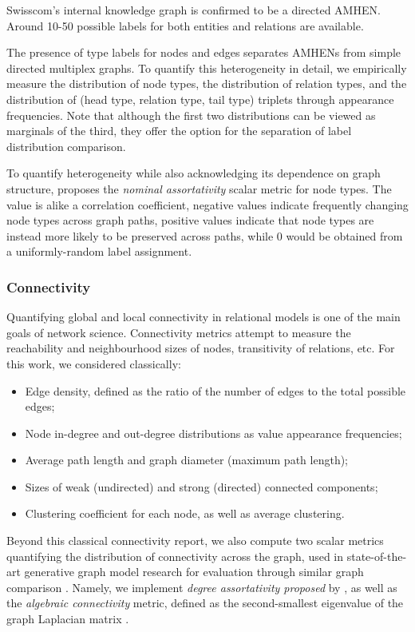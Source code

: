 Swisscom's internal knowledge graph is confirmed to be a directed AMHEN. Around 10-50 possible labels for both entities and relations are available. 
 
The presence of type labels for nodes and edges separates AMHENs from simple directed multiplex graphs. To quantify this heterogeneity in detail, we empirically measure the distribution of node types, the distribution of relation types, and the distribution of (head type, relation type, tail type) triplets through appearance frequencies. Note that although the first two distributions can be viewed as marginals of the third, they offer the option for the separation of label distribution comparison. 

To quantify heterogeneity while also acknowledging its dependence on graph structure, \cite{newman_mixing_2003} proposes the \emph{nominal assortativity} scalar metric for node types. The value is alike a correlation coefficient, negative values indicate frequently changing node types across graph paths, positive values indicate that node types are instead more likely to be preserved across paths, while 0 would be obtained from a uniformly-random label assignment.

\subsubsection{Connectivity}

Quantifying global and local connectivity in relational models is one of the main goals of network science. Connectivity metrics attempt to measure the reachability and neighbourhood sizes of nodes, transitivity of relations, etc. For this work, we considered classically:
\begin{itemize}
    \item Edge density, defined as the ratio of the number of edges to the total possible edges;
    \item Node in-degree and out-degree distributions as value appearance frequencies;
    \item Average path length and graph diameter (maximum path length);
    \item Sizes of weak (undirected) and strong (directed) connected components;
    \item Clustering coefficient for each node, as well as average clustering.
\end{itemize}

Beyond this classical connectivity report, we also compute two scalar metrics quantifying the distribution of connectivity across the graph, used in state-of-the-art generative graph model research for evaluation through similar graph comparison \cite{krawczuk_gg-gan_2020}. Namely, we implement \emph{degree assortativity proposed} by \cite{newman_mixing_2003}, as well as the \emph{algebraic connectivity} metric, defined as the second-smallest eigenvalue of the graph Laplacian matrix \cite{chung_spectral_1996}.

